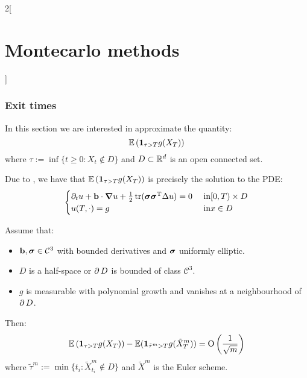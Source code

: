 \documentclass[../../../main_math.tex]{subfiles}
\begin{document}
\begin{multicols}{2}[\section{Montecarlo methods}]
  \subsubsection{Exit times}
  In this section we are interested in approximate the quantity:
  $$
    \mathbb{E}\left(\boldsymbol{\mathrm{1}}_{\tau>T}g(X_T) \right)
  $$
  where $\tau:=\inf\{ t\geq 0 : X_t\notin D\}$ and $D\subset \mathbb{R}^d$ is an open connected set.
  \begin{remark}
    Due to , we have that $\mathbb{E}\left(\boldsymbol{\mathrm{1}}_{\tau>T}g(X_T) \right)$ is precisely the solution to the PDE:
    $$
      \begin{cases}
        \partial_t u+\vf{b}\cdot \grad u+\frac{1}{2}\trace(\vf{\sigma}\transpose{\vf{\sigma}}\laplacian u)=0 & \text{ in} [0,T)\times D \\
        u(T,\cdot)=g                                                                                         & \text{ in}x\in D
      \end{cases}
    $$
  \end{remark}
  \begin{proposition}
    Assume that:
    \begin{itemize}
      \item $\boldsymbol{\mathrm{b}},\boldsymbol{\mathrm{\sigma}}\in\mathcal{C}^3$ with bounded derivatives and $\boldsymbol{\mathrm{\sigma}}$ uniformly elliptic.
      \item $D$ is a half-space or $\operatorname{\partial}{D}$ is bounded of class $\mathcal{C}^3$.
      \item $g$ is measurable with polynomial growth and vanishes at a neighbourhood of $\operatorname{\partial}{D}$.
    \end{itemize}
    Then:
    $$
      \mathbb{E}\left(\boldsymbol{\mathrm{1}}_{\tau>T}g(X_T) \right)-\mathbb{E}(\boldsymbol{\mathrm{1}}_{\tilde\tau^m>T} g(\tilde{X}^m_T))=\mathrm{O}\left(\frac{1}{\sqrt{m}}\right)
    $$
    where $\tilde\tau^m:=\min\{ t_i: \tilde{X}^m_{t_i}\notin D\}$ and $\tilde{X}^m$ is the Euler scheme.
  \end{proposition}
\end{multicols}
\end{document}
